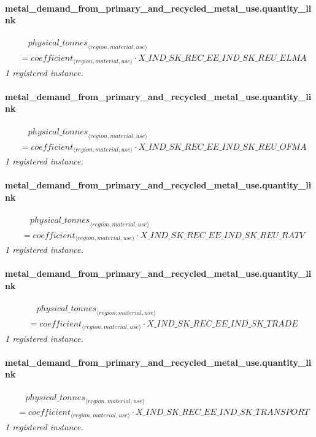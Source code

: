 \documentclass[11pt]{article}
\begin{document}
\paragraph{metal\_demand\_from\_primary\_and\_recycled\_metal\_use.quantity\_link}
\begin{align*}
&\quad {physical\_tonnes}_{\langle region, material, use\rangle}\\
&= coefficient_{\langle region, material, use\rangle} \cdot X\_IND\_SK\_REC\_EE\_IND\_SK\_REU\_ELMA
\end{align*}
\noindent\emph{1 registered instance.}\par
\paragraph{metal\_demand\_from\_primary\_and\_recycled\_metal\_use.quantity\_link}
\begin{align*}
&\quad {physical\_tonnes}_{\langle region, material, use\rangle}\\
&= coefficient_{\langle region, material, use\rangle} \cdot X\_IND\_SK\_REC\_EE\_IND\_SK\_REU\_OFMA
\end{align*}
\noindent\emph{1 registered instance.}\par
\paragraph{metal\_demand\_from\_primary\_and\_recycled\_metal\_use.quantity\_link}
\begin{align*}
&\quad {physical\_tonnes}_{\langle region, material, use\rangle}\\
&= coefficient_{\langle region, material, use\rangle} \cdot X\_IND\_SK\_REC\_EE\_IND\_SK\_REU\_RATV
\end{align*}
\noindent\emph{1 registered instance.}\par
\paragraph{metal\_demand\_from\_primary\_and\_recycled\_metal\_use.quantity\_link}
\begin{align*}
&\quad {physical\_tonnes}_{\langle region, material, use\rangle}\\
&= coefficient_{\langle region, material, use\rangle} \cdot X\_IND\_SK\_REC\_EE\_IND\_SK\_TRADE
\end{align*}
\noindent\emph{1 registered instance.}\par
\paragraph{metal\_demand\_from\_primary\_and\_recycled\_metal\_use.quantity\_link}
\begin{align*}
&\quad {physical\_tonnes}_{\langle region, material, use\rangle}\\
&= coefficient_{\langle region, material, use\rangle} \cdot X\_IND\_SK\_REC\_EE\_IND\_SK\_TRANSPORT
\end{align*}
\noindent\emph{1 registered instance.}\par
\end{document}
